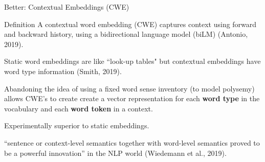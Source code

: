 \begin{frame}{Better: Contextual Embeddings (CWE)}

\begin{definitionBlock}{Definition}
    A \alert{contextual word embedding (CWE)} captures context using forward and backward history, using a bidirectional language model (biLM) (Antonio, 2019). 
    
    Static word embeddings are like ``look-up tables" but contextual embeddings have word type information (Smith, 2019). 
\end{definitionBlock}

\begin{itemizeSpaced}{7pt}

    \pinkbox Abandoning the idea of using a fixed word sense inventory (to model polysemy) allows CWE's to create create a vector representation for each \textbf{word type} in the vocabulary and each \textbf{word token} in a context. 
    
    \item Experimentally superior to static embeddings.
    
    \item ``sentence or context-level semantics together with word-level semantics proved to be a powerful innovation” in the NLP world (Wiedemann et al., 2019).
    
    
\end{itemizeSpaced}
    
\end{frame}